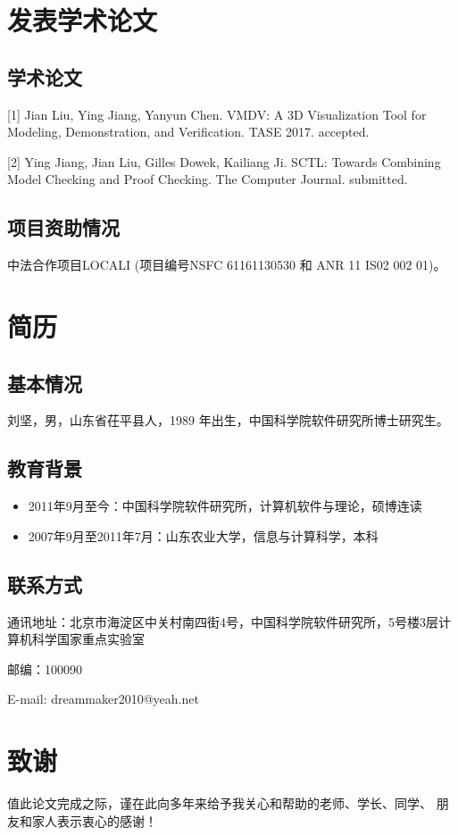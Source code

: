 \chapter{发表学术论文}

\section*{学术论文}

\hspace{-0.9cm}[1] Jian Liu, Ying Jiang, Yanyun Chen. VMDV: A 3D Visualization Tool for Modeling, Demonstration, and Verification. TASE 2017. accepted.

\hspace{-0.9cm}[2] Ying Jiang, Jian Liu, Gilles Dowek, Kailiang Ji. SCTL: Towards Combining Model Checking and Proof Checking. The Computer Journal. submitted.

\section*{项目资助情况}

中法合作项目LOCALI (项目编号NSFC 61161130530 和 ANR 11 IS02 002 01)。


\chapter{简历}

\section*{基本情况}

刘坚，男，山东省茌平县人，1989 年出生，中国科学院软件研究所博士研究生。

\section*{教育背景}
\begin{itemize}
	\item 2011年9月至今：中国科学院软件研究所，计算机软件与理论，硕博连读
	\item 2007年9月至2011年7月：山东农业大学，信息与计算科学，本科
\end{itemize}

\section*{联系方式}

通讯地址：北京市海淀区中关村南四街4号，中国科学院软件研究所，5号楼3层计算机科学国家重点实验室

邮编：100090

E-mail: dreammaker2010@yeah.net



\chapter{致\quad 谢}

值此论文完成之际，谨在此向多年来给予我关心和帮助的老师、学长、同学、
朋友和家人表示衷心的感谢！

